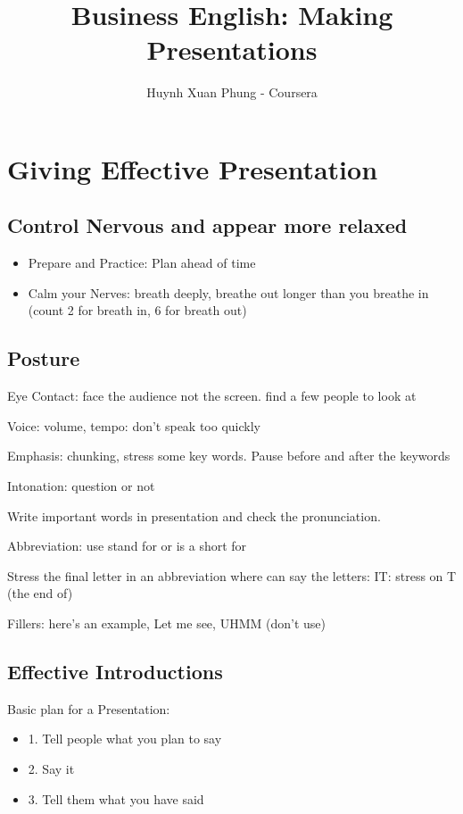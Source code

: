 \documentclass{article}
\title{Business English: Making Presentations}
\author{Huynh Xuan Phung - Coursera}
\date{ }
\begin{document}
 
\maketitle
 
\tableofcontents
\section{Giving Effective Presentation}
\subsection{Control Nervous and appear more relaxed}

\begin{itemize}
\item{Prepare and Practice: Plan ahead of time}
\item{Calm your Nerves: breath deeply, breathe out longer than you breathe in (count 2 for breath in, 6 for breath out)}
\end{itemize}

\subsection{Posture}
Eye Contact: face the audience not the screen. find a few people to look at

Voice: volume, tempo: don't speak too quickly

Emphasis: chunking, stress some key words. Pause before and after the keywords

Intonation: question or not

Write important words in presentation and check the pronunciation.

Abbreviation: use stand for or is a short for

Stress the final letter in an abbreviation where can say the letters: IT: stress on T (the end of)

Fillers: here's an example, Let me see, UHMM (don't use)

\subsection{Effective Introductions}

Basic plan for a Presentation:
\begin{itemize}
\item{1. Tell people what you plan to say}
\item{2. Say it}
\item{3. Tell them what you have said}
\end{itemize}
\end{document}
